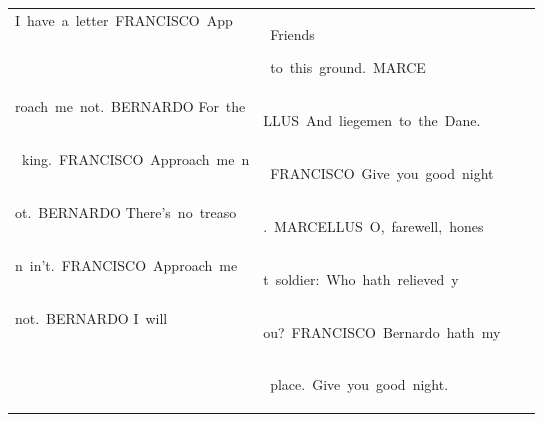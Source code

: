 \begin{table}[h]
\begin{tabular}{ l  l  l  l}
  I\ have\ a\ letter\ FRANCISCO\ App & \colorbox{cm_51!40}{\strut \ Friends}\colorbox{cm_63!40}{\strut \ to\ this\ ground.\ MARCE} &  &  \\ 
 roach\ me\ not.\ BERNARDO For\ the & \colorbox{cm_63!40}{\strut LLUS\ And\ liegemen\ to\ the\ Dane.} &  &  \\ 
 \ king.\ FRANCISCO\ Approach\ me\ n & \colorbox{cm_63!40}{\strut \ FRANCISCO\ Give\ you\ good\ night} &  &  \\ 
 ot.\ BERNARDO There's\ no\ treaso & \colorbox{cm_63!40}{\strut .\ MARCELLUS\ O,\ farewell,\ hones} &  &  \\ 
 n\ in't.\ FRANCISCO\ Approach\ me\  & \colorbox{cm_63!40}{\strut t\ soldier:\ Who\ hath\ relieved\ y} &  &  \\ 
 not.\ BERNARDO I\ will & \colorbox{cm_63!40}{\strut ou?\ FRANCISCO\ Bernardo\ hath\ my} &  &  \\ 
  & \colorbox{cm_63!40}{\strut \ place.\ Give\ you\ good\ night.} &  &  \\ 
  \midrule 
  \end{tabular}
    \label{tab:sample_hamlet}
\end{table}